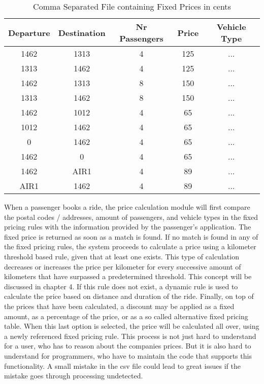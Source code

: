 \begin{table}[htbp!]
	\centering
	\begin{tabular}{c|c|c|c|c}
		\toprule
		Departure & Destination & Nr Passengers & Price & Vehicle Type \\
		\midrule
		1462      & 1313        & 4             & 125   & ...          \\
		1313      & 1462        & 4             & 125   & ...          \\
		1462      & 1313        & 8             & 150   & ...          \\
		1313      & 1462        & 8             & 150   & ...          \\
		1462      & 1012        & 4             & 65    & ...          \\
		1012      & 1462        & 4             & 65    & ...          \\
		0         & 1462        & 4             & 65    & ...          \\
		1462      & 0           & 4             & 65    & ...          \\
		1462      & AIR1        & 4             & 89    & ...          \\
		AIR1      & 1462        & 4             & 89    & ...          \\
		\bottomrule
	\end{tabular}
	\caption[Fixed Prices]{Comma Separated File containing Fixed Prices in cents}
	\label{tab:fixedprices}
\end{table}

When a passenger books a ride, the price calculation module will first compare the postal codes / addresses, amount of passengers, and vehicle types in the fixed pricing rules with the information provided by the passenger's application. The fixed price is returned as soon as a match is found. If no match is found in any of the fixed pricing rules, the system proceeds to calculate a price using a kilometer threshold based rule, given that at least one exists. This type of calculation decreases or increases the price per kilometer for every successive amount of kilometers that have surpassed a predetermined threshold. This concept will be discussed in chapter 4. If this rule does not exist, a dynamic rule is used to calculate the price based on distance and duration of the ride. Finally, on top of the prices that have been calculated, a discount may be applied as a fixed amount, as a percentage of the price, or as a so called alternative fixed pricing table. When this last option is selected, the price will be calculated all over, using a newly referenced fixed pricing rule. This process is not just hard to understand for a user, who has to reason about the companies prices. But it is also hard to understand for programmers, who have to maintain the code that supports this functionality. A small mistake in the csv file could lead to great issues if the mistake goes through processing undetected.

